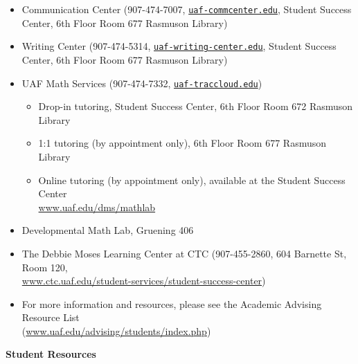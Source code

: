 \documentclass[12pt]{article}
\renewcommand{\emph}[1]{\textsf{\textbf{#1}}}
\newcommand{\localhead}[1]{\par\smallskip\textbf{#1} \smallskip\nobreak\\}%
\def\subheading#1{\localhead{\emph{#1}}}
\begin{document}
\vspace{-10mm}
\begin{itemize}
\setlength\itemsep{0em}
        \item Communication Center (907-474-7007, \href{mailto:uaf-commcenter@alaska.edu}{\texttt{uaf-commcenter\@@alaska.edu}}, Student Success Center, 6th Floor Room 677 Rasmuson Library)
        \item Writing Center (907-474-5314, \href{mailto:uaf-writing-center@alaska.edu}{\texttt{uaf-writing-center\@@alaska.edu}}, Student Success Center, 6th Floor Room 677 Rasmuson Library)
\item UAF Math Services (907-474-7332, \href{mailto:uaf-traccloud@alaska.edu}{\texttt{uaf-traccloud\@@alaska.edu}})


\begin{itemize}
\item Drop-in tutoring, Student Success Center, 6th Floor Room 672 Rasmuson Library

\item 1:1 tutoring (by appointment only), 6th Floor Room 677 Rasmuson Library

\item Online tutoring (by appointment only), available at the Student Success Center \\ \href{https://www.uaf.edu/dms/mathlab/}{www.uaf.edu/dms/mathlab}
\end{itemize}

\item Developmental Math Lab, Gruening 406
\item The Debbie Moses Learning Center at CTC (907-455-2860, 604 Barnette St, Room 120,\\ \href{https://www.ctc.uaf.edu/student-services/student-success-center/}{www.ctc.uaf.edu/student-services/student-success-center})
\item For more information and resources, please see the Academic Advising Resource List \\ (\href{https://www.uaf.edu/advising/students/index.php}{www.uaf.edu/advising/students/index.php})
\end{itemize}

\clearpage \newpage
\subheading{Student Resources}
\end{document}
